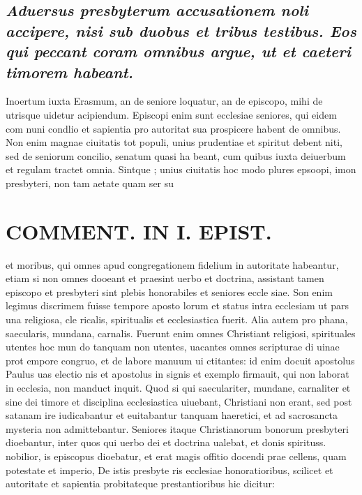 \documentclass{article}
\begin{document}
\begin{pages}
\subsection*{\textit{Aduersus presbyterum accusationem noli accipere, nisi sub duobus et tribus testibus. Eos qui peccant coram omnibus argue, ut et caeteri timorem habeant. }}\pstart Inoertum iuxta Erasmum, an de seniore loquatur, an de episcopo, mihi de utrisque uidetur acipiendum. Episcopi enim sunt ecclesiae seniores, qui eidem com nuni condlio et sapientia pro autoritat sua prospicere habent de omnibus. Non enim magnae ciuitatis tot populi, unius prudentiae et spiritut debent niti, sed de seniorum concilio, senatum quasi ha beant, cum quibus iuxta deiuerbum et regulam tractet omnia. Sintque ; unius ciuitatis hoc modo plures epsoopi, imon presbyteri, non tam aetate quam ser su  \pend
\section*{COMMENT. IN I. EPIST. }
\marginpar{[ p.142 ]}\pstart et moribus, qui omnes apud congregationem fidelium in autoritate habeantur, etiam si non omnes dooeant et praesint uerbo et doctrina, assistant tamen episcopo et presbyteri sint plebis honorabiles et seniores eccle siae. Son enim legimus discrimem fuisse tempore aposto lorum et status intra ecclesiam ut pars una religiosa, cle ricalis, spiritualis et ecclesiastica fuerit. Alia autem pro phana, saecularis, mundana, carnalis. Fuerunt enim omnes Christiant religiosi, spirituales utentes hoc mun do tanquam non utentes, uacantes omnes scripturae di uinae prot empore congruo, et de labore manuum ui ctitantes: id enim docuit apostolus Paulus uas electio nis et apostolus in signis et exemplo firmauit, qui non laborat in ecclesia, non manduct inquit. Quod si qui saeculariter, mundane, carnaliter et sine dei timore et disciplina ecclesiastica uiuebant, Christiani non erant, sed post satanam ire iudicabantur et euitabantur tanquam haeretici, et ad sacrosancta mysteria non admittebantur. Seniores itaque Christianorum bonorum presbyteri dioebantur, inter quos qui uerbo dei et doctrina ualebat, et donis spirituss. nobilior, is episcopus dioebatur, et erat magis offitio docendi prae cellens, quam potestate et imperio, De istis presbyte ris ecclesiae honoratioribus, scilicet et autoritate et sapientia probitateque prestantioribus hic dicitur:  \pend

\end{pages}
\end{document}
